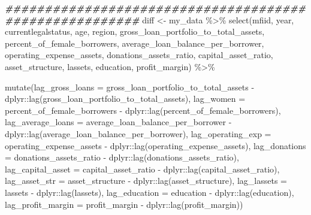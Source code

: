 \documentclass[a4paper,nobind]{templates/ociamthesis}
\newenvironment{Shaded}{\begin{snugshade}}{\end{snugshade}}
\newcommand{\AttributeTok}[1]{\textcolor[rgb]{0.77,0.63,0.00}{#1}}
\newcommand{\DocumentationTok}[1]{\textcolor[rgb]{0.56,0.35,0.01}{\textbf{\textit{#1}}}}
\newcommand{\FunctionTok}[1]{\textcolor[rgb]{0.00,0.00,0.00}{#1}}
\newcommand{\NormalTok}[1]{#1}
\newcommand{\OtherTok}[1]{\textcolor[rgb]{0.56,0.35,0.01}{#1}}
\newcommand{\SpecialCharTok}[1]{\textcolor[rgb]{0.00,0.00,0.00}{#1}}
\renewenvironment{Shaded}
{
  \vspace{10pt}%
  \begin{snugshade}%
}{%
  \end{snugshade}%
  \vspace{8pt}%
}
\begin{document}
\begin{Shaded}
\begin{Highlighting}[]
\DocumentationTok{\#\#\#\#\#\#\#\#\#\#\#\#\#\#\#\#\#\#\#\#\#\#\#\#\#\#\#\#\#\#\#\#\#\#\#\#\#\#\#\#\#\#\#\#\#\#\#\#\#\#\#\#\#\#\#}
\NormalTok{diff }\OtherTok{\textless{}{-}}\NormalTok{ my\_data }\SpecialCharTok{\%\textgreater{}\%} \FunctionTok{select}\NormalTok{(mfiid, year, currentlegalstatus, }
\NormalTok{                       age, region, }
\NormalTok{                       gross\_loan\_portfolio\_to\_total\_assets, }
\NormalTok{                       percent\_of\_female\_borrowers, }
\NormalTok{                       average\_loan\_balance\_per\_borrower, }
\NormalTok{                             operating\_expense\_assets, }
\NormalTok{                             donations\_assets\_ratio, }
\NormalTok{                             capital\_asset\_ratio, }
\NormalTok{                             asset\_structure, lassets, }
\NormalTok{                             education, profit\_margin) }\SpecialCharTok{\%\textgreater{}\%} 
  
  \FunctionTok{mutate}\NormalTok{(}\AttributeTok{lag\_gross\_loans =}\NormalTok{ gross\_loan\_portfolio\_to\_total\_assets }\SpecialCharTok{{-}} 
\NormalTok{           dplyr}\SpecialCharTok{::}\FunctionTok{lag}\NormalTok{(gross\_loan\_portfolio\_to\_total\_assets), }
         \AttributeTok{lag\_women =}\NormalTok{ percent\_of\_female\_borrowers }\SpecialCharTok{{-}} 
\NormalTok{           dplyr}\SpecialCharTok{::}\FunctionTok{lag}\NormalTok{(percent\_of\_female\_borrowers), }
         \AttributeTok{lag\_average\_loans =}\NormalTok{ average\_loan\_balance\_per\_borrower }\SpecialCharTok{{-}}\NormalTok{ dplyr}\SpecialCharTok{::}\FunctionTok{lag}\NormalTok{(average\_loan\_balance\_per\_borrower), }
         \AttributeTok{lag\_operating\_exp =}\NormalTok{ operating\_expense\_assets }\SpecialCharTok{{-}} 
\NormalTok{           dplyr}\SpecialCharTok{::}\FunctionTok{lag}\NormalTok{(operating\_expense\_assets), }
         \AttributeTok{lag\_donations =}\NormalTok{ donations\_assets\_ratio }\SpecialCharTok{{-}} 
\NormalTok{           dplyr}\SpecialCharTok{::}\FunctionTok{lag}\NormalTok{(donations\_assets\_ratio), }
         \AttributeTok{lag\_capital\_asset =}\NormalTok{ capital\_asset\_ratio }\SpecialCharTok{{-}} 
\NormalTok{           dplyr}\SpecialCharTok{::}\FunctionTok{lag}\NormalTok{(capital\_asset\_ratio), }
         \AttributeTok{lag\_asset\_str =}\NormalTok{ asset\_structure }\SpecialCharTok{{-}} 
\NormalTok{           dplyr}\SpecialCharTok{::}\FunctionTok{lag}\NormalTok{(asset\_structure), }
         \AttributeTok{lag\_lassets =}\NormalTok{ lassets }\SpecialCharTok{{-}}\NormalTok{ dplyr}\SpecialCharTok{::}\FunctionTok{lag}\NormalTok{(lassets), }
         \AttributeTok{lag\_education =}\NormalTok{ education }\SpecialCharTok{{-}}\NormalTok{ dplyr}\SpecialCharTok{::}\FunctionTok{lag}\NormalTok{(education), }
         \AttributeTok{lag\_profit\_margin =}\NormalTok{ profit\_margin }\SpecialCharTok{{-}}\NormalTok{ dplyr}\SpecialCharTok{::}\FunctionTok{lag}\NormalTok{(profit\_margin))}


\end{Highlighting}
\end{Shaded}
\end{document}
